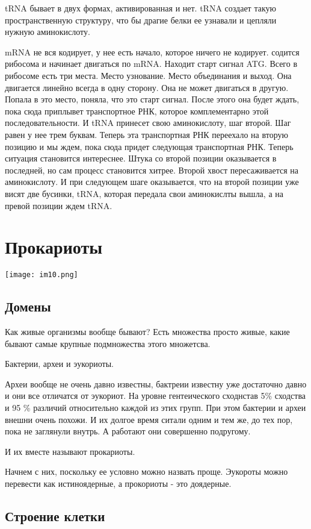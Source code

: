 tRNA бывает в двух формах, активированная и нет. tRNA создает такую пространственную
структуру, что бы драгие белки ее узнавали и цепляли нужную аминокислоту.

mRNA не вся кодирует, у нее есть начало, которое ничего не кодирует. содится рибосома и
начинает двигаться по mRNA. Находит старт сигнал ATG. Всего в рибосоме есть три места.
Место узнование. Место объединания и выход. Она двигается линейно всегда в одну сторону.
Она не может двигаться в другую. Попала в это место, поняла, что 
это старт сигнал. После этого она будет ждать, пока 
сюда приплывет транспортное РНК, которое комплементарно этой последовательности. 
И tRNA принесет свою аминокислоту, шаг второй. Шаг равен у нее трем буквам. Теперь эта 
транспортная РНК переехало на вторую позицию и мы ждем, пока сюда придет следующая 
транспортная РНК. Теперь ситуация становится интереснее. Штука со второй позиции оказывается 
в последней, но сам процесс становится хитрее. Второй хвост пересаживается на аминокислоту. 
И при следующем шаге оказывается, что на второй позиции уже висят две бусинки, tRNA, которая 
передала свои аминокислты вышла, а на превой позиции ждем tRNA.

\section{Прокариоты} 
\texttt{[image: im10.png]}
\subsection{Домены}
Как живые организмы вообще бывают? 
Есть множества просто живые, какие бывают самые крупные подмножества 
этого множетсва. 

Бактерии, археи и эукориоты. 

Археи вообще не очень давно известны, бактреии известну уже 
достаточно давно и они все отличатся от эукориот. На уровне 
гентеического сходнстав 5\% сходства и 95 \% различий относительно каждой из этих 
групп. При этом бактерии и археи внешни очень похожи. И их 
долгое время ситали одним и тем же, до тех пор, 
пока не заглянули внутрь. А работают они совершенно подругому. 

И их вместе называют прокариоты. 

Начнем с них, поскольку ее условно можно назвать проще. Эукороты 
можно перевести как истиноядерные, а прокориоты - это доядерные. 

\subsection{Строение клетки}

